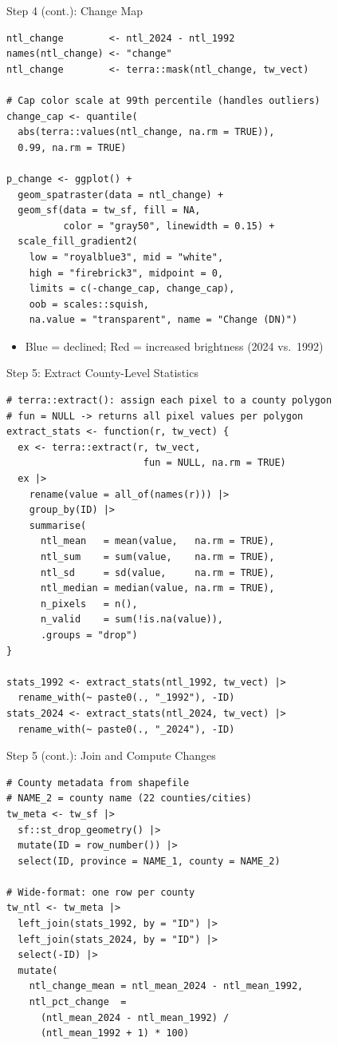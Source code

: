 \documentclass[dvipsnames,hyperref={pdfpagelabels=false}]{beamer}
\begin{document}
\begin{frame}[fragile]{Step 4 (cont.): Change Map}
\begin{lstlisting}
ntl_change        <- ntl_2024 - ntl_1992
names(ntl_change) <- "change"
ntl_change        <- terra::mask(ntl_change, tw_vect)

# Cap color scale at 99th percentile (handles outliers)
change_cap <- quantile(
  abs(terra::values(ntl_change, na.rm = TRUE)),
  0.99, na.rm = TRUE)

p_change <- ggplot() +
  geom_spatraster(data = ntl_change) +
  geom_sf(data = tw_sf, fill = NA,
          color = "gray50", linewidth = 0.15) +
  scale_fill_gradient2(
    low = "royalblue3", mid = "white",
    high = "firebrick3", midpoint = 0,
    limits = c(-change_cap, change_cap),
    oob = scales::squish,
    na.value = "transparent", name = "Change (DN)")
\end{lstlisting}
\begin{itemize}
  \item Blue = declined; Red = increased brightness (2024 vs.\ 1992)
\end{itemize}
\end{frame}


\begin{frame}[fragile]{Step 5: Extract County-Level Statistics}
\begin{lstlisting}
# terra::extract(): assign each pixel to a county polygon
# fun = NULL -> returns all pixel values per polygon
extract_stats <- function(r, tw_vect) {
  ex <- terra::extract(r, tw_vect,
                        fun = NULL, na.rm = TRUE)
  ex |>
    rename(value = all_of(names(r))) |>
    group_by(ID) |>
    summarise(
      ntl_mean   = mean(value,   na.rm = TRUE),
      ntl_sum    = sum(value,    na.rm = TRUE),
      ntl_sd     = sd(value,     na.rm = TRUE),
      ntl_median = median(value, na.rm = TRUE),
      n_pixels   = n(),
      n_valid    = sum(!is.na(value)),
      .groups = "drop")
}

stats_1992 <- extract_stats(ntl_1992, tw_vect) |>
  rename_with(~ paste0(., "_1992"), -ID)
stats_2024 <- extract_stats(ntl_2024, tw_vect) |>
  rename_with(~ paste0(., "_2024"), -ID)
\end{lstlisting}
\end{frame}


\begin{frame}[fragile]{Step 5 (cont.): Join and Compute Changes}
\begin{lstlisting}
# County metadata from shapefile
# NAME_2 = county name (22 counties/cities)
tw_meta <- tw_sf |>
  sf::st_drop_geometry() |>
  mutate(ID = row_number()) |>
  select(ID, province = NAME_1, county = NAME_2)

# Wide-format: one row per county
tw_ntl <- tw_meta |>
  left_join(stats_1992, by = "ID") |>
  left_join(stats_2024, by = "ID") |>
  select(-ID) |>
  mutate(
    ntl_change_mean = ntl_mean_2024 - ntl_mean_1992,
    ntl_pct_change  =
      (ntl_mean_2024 - ntl_mean_1992) /
      (ntl_mean_1992 + 1) * 100)
\end{lstlisting}
\end{frame}
\end{document}

